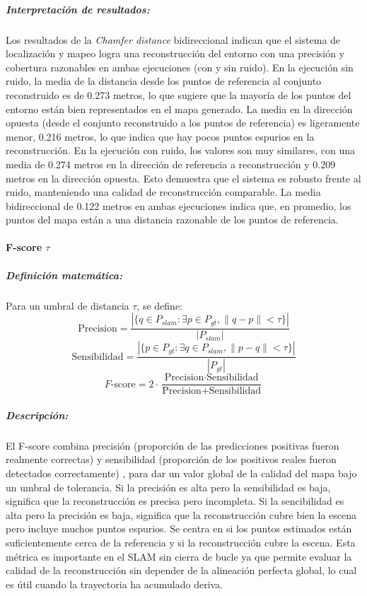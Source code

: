 \documentclass[12pt, a4paper, twoside]{article}
\begin{document}
\subparagraph{Interpretación de resultados:}
Los resultados de la \textit{Chamfer distance} bidireccional indican que el sistema de localización y mapeo logra una reconstrucción del entorno con una precisión y 
cobertura razonables en ambas ejecuciones (con y sin ruido).
En la ejecución sin ruido, la media de la distancia desde los puntos de referencia al conjunto reconstruido es de 0.273 metros,
lo que sugiere que la mayoría de los puntos del entorno están bien representados en el mapa generado.
La media en la dirección opuesta (desde el conjunto reconstruido a los puntos de referencia) es ligeramente menor, 0.216 metros,
lo que indica que hay pocos puntos espurios en la reconstrucción.\newline
En la ejecución con ruido, los valores son muy similares, con una media de 0.274 metros en la dirección de referencia a reconstrucción y
0.209 metros en la dirección opuesta. Esto demuestra que el sistema es robusto frente al ruido, manteniendo una calidad de reconstrucción comparable.\newline
La media bidireccional de 0.122 metros en ambas ejecuciones indica que, en promedio, los puntos del mapa están a una distancia razonable de los puntos de referencia.

\paragraph{F-score \(\tau\)}

\subparagraph{Definición matemática:}
Para un umbral de distancia $\tau$, se define:
\[
\text{Precision} = \frac{|\{ q \in P_{slam} : \exists p \in P_{gt}, \|q-p\| < \tau \}|}{|P_{slam}|}
\]
\[
\text{Sensibilidad} = \frac{|\{ p \in P_{gt} : \exists q \in P_{slam}, \|p-q\| < \tau \}|}{|P_{gt}|}
\]
\[
F\text{-score} = 2 \cdot \frac{\text{Precision} \cdot \text{Sensibilidad}}{\text{Precision} + \text{Sensibilidad}}
\]

\subparagraph{Descripción:}
El F-score combina precisión (proporción de las predicciones positivas fueron realmente correctas) y sensibilidad (proporción de los positivos reales fueron detectados correctamente) 
, para dar un valor global de la calidad del mapa bajo un umbral de tolerancia. Si la precisión es alta pero la sensibilidad es baja, significa que la reconstrucción es precisa pero incompleta.
Si la sencibilidad es alta pero la precisión es baja, significa que la reconstrucción cubre bien la escena pero incluye muchos puntos espurios.
Se centra en si los puntos estimados están suficientemente cerca de la referencia y si la reconstrucción cubre la escena.
Esta métrica es importante en el SLAM sin cierra de bucle ya que permite evaluar la calidad de la reconstrucción sin depender de la alineación 
perfecta global, lo cual es útil cuando la trayectoria ha acumulado deriva.
\end{document}
